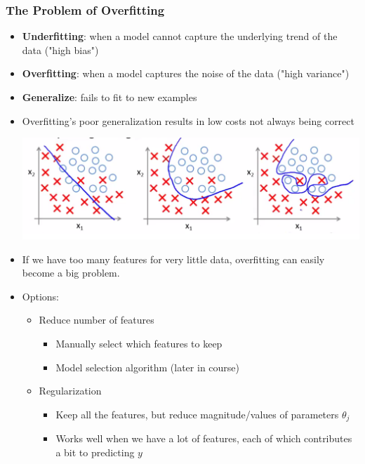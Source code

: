 \subsubsection{The Problem of Overfitting}
\begin{itemize}[--]
	\item \textbf{Underfitting}: when a model cannot capture the underlying trend of the data ("high bias")
	\item \textbf{Overfitting}: when a model captures the noise of the data ("high variance")
	\item \textbf{Generalize}: fails to fit to new examples
	\item Overfitting's poor generalization results in low costs not always being correct
	\begin{center}
		\includegraphics[scale=0.5]{sections/cs229/w4/over-under.png}
	\end{center}

	\item If we have too many features for very little data, overfitting can easily become a big problem.
	\item Options:
	\begin{itemize}
		\item Reduce number of features
		\begin{itemize}
			\item Manually select which features to keep
			\item Model selection algorithm (later in course)
		\end{itemize}
		\item Regularization
		\begin{itemize}
			\item Keep all the features, but reduce magnitude/values of parameters $\theta_j$
			\item Works well when we have a lot of features, each of which contributes a bit to predicting $y$
		\end{itemize}
	\end{itemize}

\end{itemize}

